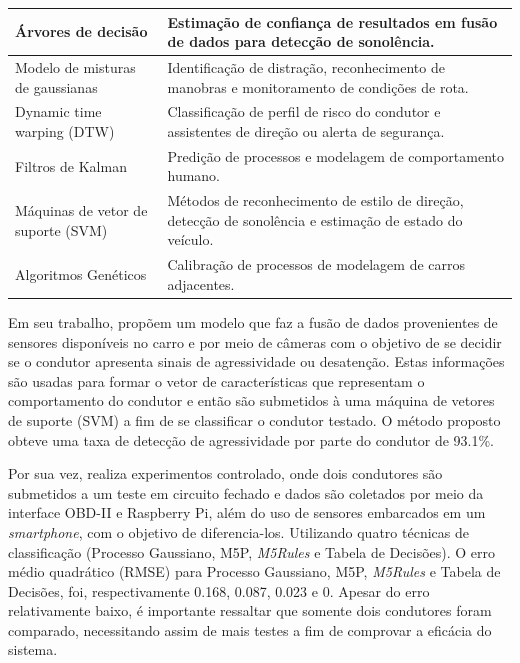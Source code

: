 \begin{table}[!htb]
\begin{tabular}{p{55mm}|p{95mm}}
		Árvores de decisão                     & Estimação de confiança de resultados em fusão de dados para detecção de sonolência.                                                 \\ \hline
		Modelo de misturas de gaussianas       & Identificação de distração, reconhecimento de manobras e monitoramento de condições de rota.                                       \\ \hline
		Dynamic time warping (DTW)             & Classificação de perfil de risco do condutor e assistentes de direção ou alerta de segurança.                                       \\ \hline
		Filtros de Kalman                      & Predição de processos e modelagem de comportamento humano.                                                                          \\ \hline
		Máquinas de vetor de suporte (SVM)     & Métodos de reconhecimento de estilo de direção, detecção de sonolência e estimação de estado do veículo.                            \\ \hline
		Algoritmos Genéticos                   & Calibração de processos de modelagem de carros adjacentes.                                                                          \\ \hline
	\end{tabular}
\end{table}

Em seu trabalho,  propõem um modelo que faz a fusão de dados provenientes de sensores disponíveis no carro e por meio de câmeras com o objetivo de se decidir se o condutor apresenta sinais de agressividade ou desatenção. Estas informações são usadas para formar o vetor de características que representam o comportamento do condutor e então são submetidos à uma máquina de vetores de suporte (SVM) a fim de se classificar o condutor testado. O método proposto obteve uma taxa de detecção de agressividade por parte do condutor de 93.1\%.

Por sua vez,  realiza experimentos controlado, onde dois condutores são submetidos a um teste em circuito fechado e dados são coletados por meio da interface OBD-II e Raspberry Pi, além do uso de sensores embarcados em um \textit{smartphone}, com o objetivo de diferencia-los. Utilizando quatro técnicas de classificação (Processo Gaussiano, M5P, \textit{M5Rules} e Tabela de Decisões). O erro médio quadrático (RMSE) para Processo Gaussiano, M5P, \textit{M5Rules} e Tabela de Decisões, foi, respectivamente 0.168, 0.087, 0.023 e 0. Apesar do erro relativamente baixo, é importante ressaltar que somente dois condutores foram comparado, necessitando assim de mais testes a fim de comprovar a eficácia do sistema.

